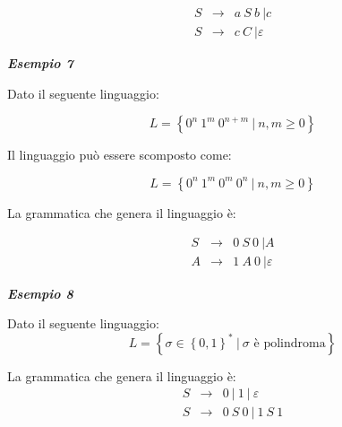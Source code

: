 \documentclass[a4paper]{article}
\begin{document}
	\begin{equation*}
		\begin{array}{lll}
			S & \longrightarrow & a \: S \: b \: | c \\
			S & \longrightarrow & c \: C \: | \varepsilon
		\end{array}
	\end{equation*}
	
	\newpage
	
	\noindent
	\textcolor{Green4}{\textbf{\emph{Esempio 7}}}
	
	\noindent
	Dato il seguente linguaggio:
	
	\begin{equation*}
		L = \left\{0^{n} \: 1^{m} \: 0^{n + m} \: | \: n,m \ge 0\right\}
	\end{equation*}

	\noindent
	Il linguaggio può essere scomposto come:
	
	\begin{equation*}
		L = \left\{0^{n} \: 1^{m} \: 0^{m} \: 0^{n} \: | \: n,m \ge 0\right\}
	\end{equation*}

	\noindent
	La grammatica che genera il linguaggio è:
	
	\begin{equation*}
		\begin{array}{lll}
			S & \longrightarrow & 0 \: S \: 0 \: | A \\
			A & \longrightarrow & 1 \: A \: 0 \: | \varepsilon
		\end{array}
	\end{equation*}
	\:\newline
	
	\noindent
	\textcolor{Green4}{\textbf{\emph{Esempio 8}}}
	
	\noindent
	Dato il seguente linguaggio:
	\begin{equation*}
		L = \left\{\sigma \in \left\{0,1\right\}^{*} \: \left| \: \sigma \text{ è polindroma} \right.\right\}
	\end{equation*}

	\noindent
	La grammatica che genera il linguaggio è:
	\begin{equation*}
		\begin{array}{lll}
			S & \longrightarrow & 0 \: | \: 1 \: | \: \varepsilon \\
			S & \longrightarrow & 0 \: S \: 0 \: | \: 1 \: S \: 1
		\end{array}
	\end{equation*}
	\:\newline
	
\end{document}
